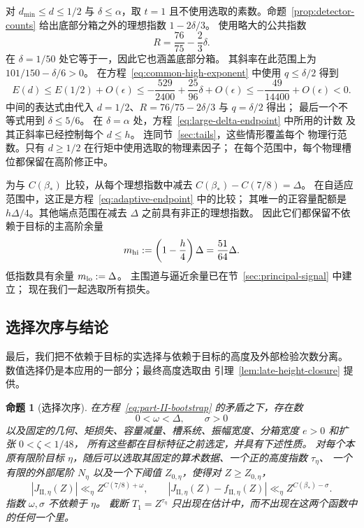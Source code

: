 \documentclass[11pt,a4paper]{article}
\numberwithin{equation}{section}
\numberwithin{figure}{section}
\newtheorem{proposition}[theorem]{命题}
\theoremstyle{definition}
\theoremstyle{remark}
\begin{document}
对 \(d_{\min}\le d\le1/2\) 与 \(\delta\le\alpha\)，取 \(t=1\)
且不使用选取的素数。命题~\ref{prop:detector-counts}
给出底部分箱之外的理想指数 \(1-2\delta/3\)。
使用略大的公共指数
\[
 R=\frac{76}{75}-\frac23\delta.
\]
在 \(\delta=1/50\) 处它等于一，因此它也涵盖底部分箱。
其斜率在此范围上为 \(101/150-\delta/6>0\)。
在方程~\eqref{eq:common-high-exponent} 中使用 \(q\le\delta/2\) 得到
\begin{equation}
 E(d)\le E(1/2)+O(\epsilon)
 \le-\frac{529}{2400}+\frac{25}{96}\delta+O(\epsilon)
 \le-\frac{49}{14400}+O(\epsilon)<0.
 \label{eq:adaptive-intermediate}
\end{equation}
中间的表达式由代入
\(d=1/2\)、\(R=76/75-2\delta/3\) 与 \(q=\delta/2\) 得出；
最后一个不等式用到 \(\delta\le5/6\)。
在 \(\delta=\alpha\) 处，方程~\eqref{eq:large-delta-endpoint} 中所用的计数
及其正斜率已经控制每个 \(d\le h\)。
连同节~\ref{sec:tails}，这些情形覆盖每个
物理行范数。只有 \(d\ge1/2\) 在行矩中使用选取的物理素因子；
在每个范围中，每个物理槽位都保留在高阶修正中。

为与 \(C(\beta_*)\) 比较，从每个理想指数中减去
\(C(\beta_*)-C(7/8)=\Delta\)。
在自适应范围中，这正是方程~\eqref{eq:adaptive-endpoint} 中的比较；
其唯一的正容量配额是 \(h\Delta/4\)。其他端点范围在减去 \(\Delta\)
之前具有非正的理想指数。
因此它们都保留不依赖于目标的主高阶余量
\[
 m_{\rm hi}:=\left(1-\frac h4\right)\Delta
             =\frac{51}{64}\Delta.
\]
低指数具有余量 \(m_{\rm lo}:=\Delta\)。
主围道与逼近余量已在节~\ref{sec:principal-signal} 中建立；
现在我们一起选取所有损失。

\subsection{选择次序与结论}

最后，我们把不依赖于目标的实选择与依赖于目标的高度及外部检验次数分离。
数值选择仍是本应用的一部分；最终高度选取由
引理~\ref{lem:late-height-closure} 提供。

\begin{proposition}[选择次序]\label{prop:parameter-order}
在方程~\eqref{eq:part-II-bootstrap} 的矛盾之下，存在数
\[
 0<\omega<\Delta,\qquad \sigma>0
\]
以及固定的几何、矩损失、容量减量、槽系统、振幅宽度、分箱宽度 \(e>0\) 和扩张 \(0<\zeta<1/48\)，
所有这些都在目标特征之前选定，并具有下述性质。
对每个本原有限阶目标 \(\eta\)，随后可以选取其固定的算术数据、一个正的高度指数 \(\tau_\eta\)、
一个有限的外部尾阶 \(N_\eta\) 以及一个下阈值 \(Z_{0,\eta}\)，使得对 \(Z\ge Z_{0,\eta}\)，
\[
 |J_{\mathrm{II},\eta}(Z)|\ll_\eta Z^{C(7/8)+\omega},\qquad
 |J_{\mathrm{II},\eta}(Z)-f_{\mathrm{II},\eta}(Z)|
 \ll_\eta Z^{C(\beta_*)-\sigma}.
\]
指数 \(\omega,\sigma\) 不依赖于 \(\eta\)。
截断 \(T_1=Z^{\tau_\eta}\) 只出现在估计中，而不出现在这两个函数中的任何一个里。
\end{proposition}
\end{document}
